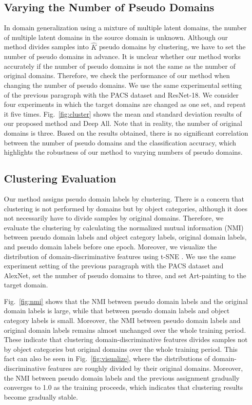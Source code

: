 \documentclass[letterpaper]{article} \usepackage{aaai20}  \usepackage{times}  \usepackage{helvet} \usepackage{courier}  \usepackage[hyphens]{url}  \usepackage{graphicx} \urlstyle{rm} \def\UrlFont{\rm}  \usepackage{graphicx}  \usepackage[whole]{bxcjkjatype}
\begin{document}
\subsection{Varying the Number of Pseudo Domains}
In domain generalization using a mixture of multiple latent domains, the number of multiple latent domains in the source domain is unknown. 
Although our method divides samples into $\hat{K}$ pseudo domains by clustering, we have to set the number of pseudo domains in advance. It is unclear whether our method works accurately if the number of pseudo domains is not the same as the number of original domains.
Therefore, we check the performance of our method when changing the number of pseudo domains. We use the same experimental setting of the previous paragraph with the PACS dataset and ResNet-18. We consider four experiments in which the target domains are changed as one set, and repeat it five times.
Fig.~\ref{fig:cluster} shows the mean and standard deviation results of our proposed method and Deep All. Note that in reality, the number of original domains is three. Based on the results obtained, there is no significant correlation between the number of pseudo domains and the classification accuracy, which highlights the robustness of our method to varying numbers of pseudo domains.

\subsection{Clustering Evaluation}
Our method assigns pseudo domain labels by clustering. There is a concern that clustering is not performed by domains but by object categories, although it does not necessarily have to divide samples by original domains.
Therefore, we evaluate the clustering by calculating the normalized mutual information (NMI) between pseudo domain labels and object category labels, original domain labels, and pseudo domain labels before one epoch. Moreover, we visualize the distribution of domain-discriminative features using t-SNE \cite{t_SNE}. We use the same experiment setting of the previous paragraph with the PACS dataset and AlexNet, set the number of pseudo domains to three, and set Art-painting to the target domain.\par
Fig.~\ref{fig:nmi} shows that the NMI between pseudo domain labels and the original domain labels is large, while that between pseudo domain labels and object category labels is small. Moreover, the NMI between pseudo domain labels and original domain labels remains almost unchanged over the whole training period. These indicate that clustering domain-discriminative features divides samples not by object categories but original domains over the whole training period. This fact can also be seen in Fig.~\ref{fig:visualize}, where the distributions of domain-discriminative features are roughly divided by their original domains. Moreover, the NMI between pseudo domain labels and the previous assignment gradually converges to 1.0 as the training proceeds, which indicates that clustering results become gradually stable.
\end{document}
